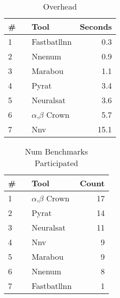


\begin{table}[h]
\begin{center}
\caption{Overhead} \label{tab:overhead}
{\setlength{\tabcolsep}{2pt}
\begin{tabular}[h]{@{}llr@{}}
\toprule
\textbf{\# ~} & \textbf{Tool} & \textbf{Seconds}\\
\midrule
1 & Fastbatllnn & 0.3 \\
2 & Nnenum & 0.9 \\
3 & Marabou & 1.1 \\
4 & Pyrat & 3.4 \\
5 & Neuralsat & 3.6 \\
6 & $\alpha$,$\beta$ Crown & 5.7 \\
7 & Nnv & 15.1 \\
\bottomrule
\end{tabular}
}
\end{center}
\end{table}




\begin{table}[h]
\begin{center}
\caption{Num Benchmarks Participated} \label{tab:stats0}
{\setlength{\tabcolsep}{2pt}
\begin{tabular}[h]{@{}llr@{}}
\toprule
\textbf{\# ~} & \textbf{Tool} & \textbf{Count}\\
\midrule
1 & $\alpha$,$\beta$ Crown & 17 \\
2 & Pyrat & 14 \\
3 & Neuralsat & 11 \\
4 & Nnv & 9 \\
5 & Marabou & 9 \\
6 & Nnenum & 8 \\
7 & Fastbatllnn & 1 \\
\bottomrule
\end{tabular}
}
\end{center}
\end{table}




